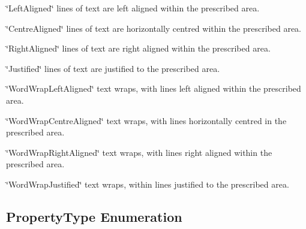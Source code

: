 \begin{DoxyItemize}
\item {\ttfamily \char`\"{}\+Left\+Aligned\char`\"{}} lines of text are left aligned within the prescribed area. \item {\ttfamily \char`\"{}\+Centre\+Aligned\char`\"{}} lines of text are horizontally centred within the prescribed area. \item {\ttfamily \char`\"{}\+Right\+Aligned\char`\"{}} lines of text are right aligned within the prescribed area. \item {\ttfamily \char`\"{}\+Justified\char`\"{}} lines of text are justified to the prescribed area. \item {\ttfamily \char`\"{}\+Word\+Wrap\+Left\+Aligned\char`\"{}} text wraps, with lines left aligned within the prescribed area. \item {\ttfamily \char`\"{}\+Word\+Wrap\+Centre\+Aligned\char`\"{}} text wraps, with lines horizontally centred in the prescribed area. \item {\ttfamily \char`\"{}\+Word\+Wrap\+Right\+Aligned\char`\"{}} text wraps, with lines right aligned within the prescribed area. \item {\ttfamily \char`\"{}\+Word\+Wrap\+Justified\char`\"{}} text wraps, within lines justified to the prescribed area.\end{DoxyItemize}
\hypertarget{fal_enum_ref_fal_enum_ref_sec_8}{}\subsection{Property\+Type Enumeration}\label{fal_enum_ref_fal_enum_ref_sec_8}
